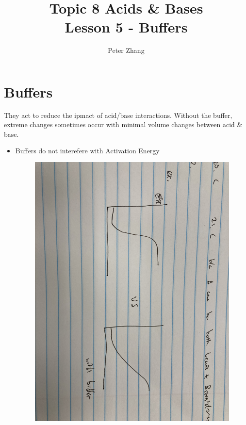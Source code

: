 \documentclass{article}
\title{Topic 8 Acids \& Bases\\Lesson 5 - Buffers}
\author{Peter Zhang}
\begin{document}
\maketitle
\tableofcontents
\newpage

\section{Buffers}
They act to reduce the ipmact of acid/base interactions. Without the buffer, extreme changes sometimes occur with minimal volume changes between acid \& base.

\begin{itemize}
\item Buffers do not interefere with Activation Energy
\begin{figure}[H]
\includegraphics[width=\textwidth]{4.5fig1.jpg}
\end{figure}
\pagebreak

\end{itemize}
\end{document}
